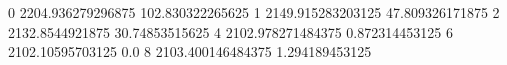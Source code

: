 0 2204.936279296875 102.830322265625
1 2149.915283203125 47.809326171875
2 2132.8544921875 30.74853515625
4 2102.978271484375 0.872314453125
6 2102.10595703125 0.0
8 2103.400146484375 1.294189453125
